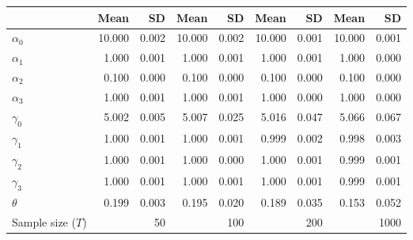 
\begin{tabular}[t]{lrrrrrrrr}
\toprule
  & Mean & SD & Mean  & SD  & Mean   & SD   & Mean    & SD   \\
\midrule
$\alpha_{0}$ & 10.000 & 0.002 & 10.000 & 0.002 & 10.000 & 0.001 & 10.000 & 0.001\\
$\alpha_{1}$ & 1.000 & 0.001 & 1.000 & 0.001 & 1.000 & 0.001 & 1.000 & 0.000\\
$\alpha_{2}$ & 0.100 & 0.000 & 0.100 & 0.000 & 0.100 & 0.000 & 0.100 & 0.000\\
$\alpha_{3}$ & 1.000 & 0.001 & 1.000 & 0.001 & 1.000 & 0.000 & 1.000 & 0.000\\
$\gamma_{0}$ & 5.002 & 0.005 & 5.007 & 0.025 & 5.016 & 0.047 & 5.066 & 0.067\\
$\gamma_{1}$ & 1.000 & 0.001 & 1.000 & 0.001 & 0.999 & 0.002 & 0.998 & 0.003\\
$\gamma_{2}$ & 1.000 & 0.001 & 1.000 & 0.000 & 1.000 & 0.001 & 0.999 & 0.001\\
$\gamma_{3}$ & 1.000 & 0.001 & 1.000 & 0.001 & 1.000 & 0.001 & 0.999 & 0.001\\
$\theta$ & 0.199 & 0.003 & 0.195 & 0.020 & 0.189 & 0.035 & 0.153 & 0.052\\
Sample size ($T$) &  & 50 &  & 100 &  & 200 &  & 1000\\
\bottomrule
\end{tabular}
